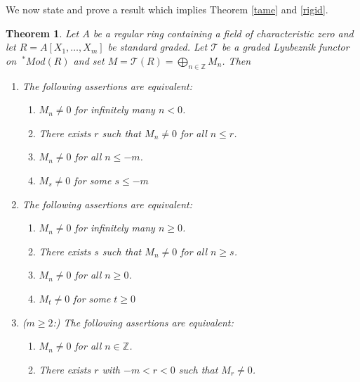 \documentclass{amsart}
\newcommand{\ZZ}{\mathbb{Z} }
\newcommand{\FF}{\mathcal{T}}
\theoremstyle{plain}
\newtheorem{theorem}{Theorem}[section]
\theoremstyle{definition}
\theoremstyle{remark}
\begin{document}
We now state and prove a result which implies Theorem \ref{tame} and \ref{rigid}.
\begin{theorem}\label{tame-rigid-general}
Let $A$ be a regular ring containing a field of characteristic zero and let $R = A[X_1,\ldots, X_m]$ be standard graded.
Let $\FF$ be a graded Lyubeznik functor on $\ ^* Mod(R)$ and set $M = \FF(R) = \bigoplus_{n \in \ZZ}M_n$. 
Then
  \begin{enumerate}[\rm (I)]
   \item The following assertions are equivalent:
   \begin{enumerate}[\rm (a)]
    \item $M_n \neq 0$ for infinitely many  $n < 0$.
    \item There exists $r$ such that $M_n \neq 0$ for all $n \leq r$.
    \item $M_n \neq 0$ for \emph{all} $n \leq -m$.
    \item
    $M_s \neq 0$ for \emph{some} $s \leq -m$
   \end{enumerate}
 \item The following assertions are equivalent:
 \begin{enumerate}[\rm (a)]
  \item $M_n \neq 0$ for infinitely many $n \geq 0$.
  \item There exists $s$ such that $M_n \neq 0$ for all $n \geq s$.
  \item $M_n \neq 0$ for \emph{all} $n \geq 0$.
  \item $M_t \neq 0$ for \emph{some} $t \geq 0$
 \end{enumerate}
 \item ($ m \geq 2$:) The following assertions are equivalent:
 \begin{enumerate}[\rm (a)]
    \item $M_n \neq 0$ for all  $n \in \ZZ $.
    \item There exists $r$  with $-m < r < 0$ such that $M_r \neq 0$. 
   \end{enumerate}
\end{enumerate}
\end{theorem}
\end{document}
